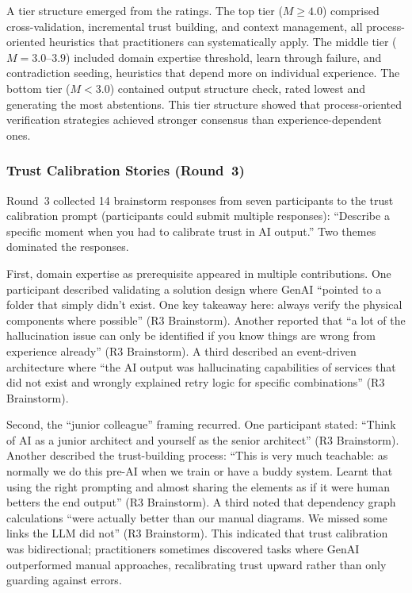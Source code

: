 A tier structure emerged from the ratings. The top tier ($M \geq 4.0$) comprised
cross-validation, incremental trust building, and context management, all
process-oriented heuristics that practitioners can systematically apply. The
middle tier ($M = 3.0$--$3.9$) included domain expertise threshold, learn through
failure, and contradiction seeding, heuristics that depend more on individual
experience. The bottom tier ($M < 3.0$) contained output structure check, rated
lowest and generating the most abstentions. This tier structure showed that process-oriented verification strategies
achieved stronger consensus than experience-dependent ones.

\subsubsection{Trust Calibration Stories (Round~3)}\label{subsubsec:trust-calibration}

Round~3 collected 14 brainstorm responses from seven participants to the trust
calibration prompt (participants could submit multiple responses):
``Describe a specific moment when you had to calibrate trust in AI output.'' Two
themes dominated the responses.

First, domain expertise as prerequisite appeared in multiple contributions. One
participant described validating a solution design where GenAI ``pointed to a
folder that simply didn't exist. One key takeaway here: always verify the
physical components where possible'' (R3 Brainstorm). Another reported that
``a lot of the hallucination issue can only be identified if you know things are
wrong from experience already'' (R3 Brainstorm). A third described an
event-driven architecture where ``the AI output was hallucinating capabilities
of services that did not exist and wrongly explained retry logic for specific
combinations'' (R3 Brainstorm).

Second, the ``junior colleague'' framing recurred. One participant stated:
``Think of AI as a junior architect and yourself as the senior architect'' (R3
Brainstorm). Another described the trust-building process: ``This is very much
teachable: as normally we do this pre-AI when we train or have a buddy system.
Learnt that using the right prompting and almost sharing the elements as if it
were human betters the end output'' (R3 Brainstorm). A third noted that
dependency graph calculations ``were actually better than our manual diagrams.
We missed some links the LLM did not'' (R3 Brainstorm). This indicated that trust calibration was bidirectional; practitioners sometimes
discovered tasks where GenAI outperformed manual approaches, recalibrating trust
upward rather than only guarding against errors.

